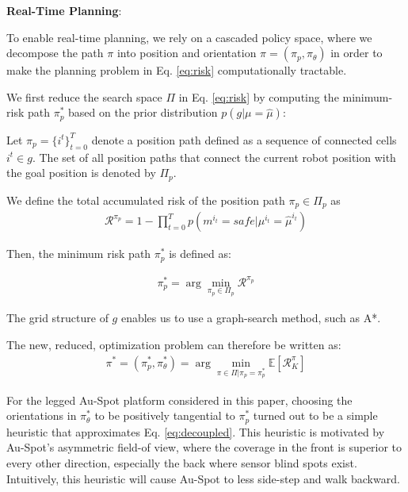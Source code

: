 \documentclass[letterpaper, 10pt, conference]{ieeeconf}      %
\newcommand{\ph}[1]{{\textbf{#1}:}} %
\newcommand{\rev}[1]{{\color{blue} #1 }} %
\begin{document}
\ph{Real-Time Planning}
\rev{To enable real-time planning, we rely on a cascaded policy space, where we decompose the path $\pi$ into position and orientation $\pi = (\pi_p,\pi_\theta)$ in order to make the planning problem in Eq. \ref{eq:risk} computationally tractable. 

We first reduce the search space $\Pi$ in Eq. \ref{eq:risk} by computing the minimum-risk path $\pi_p^*$ based on the prior distribution $p(g|\mu=\hat{\mu})$:

Let $\pi_p=\{i^t\}_{t=0}^T$ denote a position path defined as a sequence of connected cells $i^t \in g$. The set of all position paths that connect the current robot position with the goal position is denoted by $\Pi_p$.

We define the total accumulated risk of the position path $\pi_p\in\Pi_p$ as 
 \begin{align}
  \mathcal{R}^{\pi_p}=1 - \prod_{t=0}^Tp(m^{i_t}=safe|\mu^{i_t}=\hat{\mu}^{i_t})
\end{align}

Then, the minimum risk path $\pi_p^*$ is defined as:

\begin{align}
  \pi_p^* = \arg\min_{\pi_p\in\Pi_p}\mathcal{R}^{\pi_p}
  \label{eq:risk_planning}
\end{align}

The grid structure of $g$ enables us to use a graph-search method, such as A*.

The new, reduced, optimization problem can therefore be written as:
\begin{align}
 \pi^* = (\pi_p^*,\pi_\theta^*) = \arg\min_{\pi\in\Pi|\pi_p = \pi_p^*}\mathbb{E}[\mathcal{R}_K^{\pi}]
 \label{eq:decoupled}
\end{align}


For the legged Au-Spot platform considered in this paper, choosing the orientations in $\pi_\theta^*$ to be positively tangential to $\pi_p^*$ turned out to be a simple heuristic that approximates Eq. \ref{eq:decoupled}.
This heuristic is motivated by Au-Spot's asymmetric field-of view, where the coverage in the front is superior to every other direction, especially the back where sensor blind spots exist.
Intuitively, this heuristic will cause Au-Spot to less side-step and walk backward.}
\end{document}

